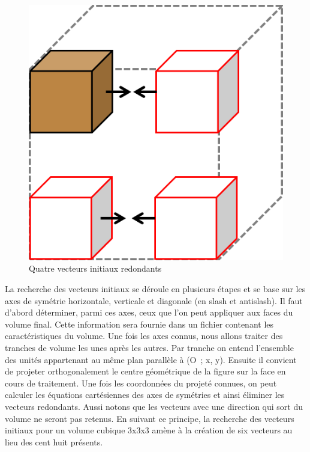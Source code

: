 \begin{figure}[h]
 \centering
 \includegraphics[scale=0.5,keepaspectratio=true]{img/startingPoint.png}
 \caption{Quatre vecteurs initiaux redondants}
 \label{startingPoint}
\end{figure}

La recherche des vecteurs initiaux se déroule en plusieurs étapes et se base sur les axes de symétrie horizontale, verticale et diagonale (en slash et antislash). Il faut d’abord déterminer, parmi ces axes, ceux que l’on peut appliquer aux faces du volume final. Cette information sera fournie dans un fichier contenant les caractéristiques du volume. Une fois les axes connus, nous allons traiter des tranches de volume les unes après les autres. Par tranche on entend l’ensemble des unités appartenant au même plan parallèle à (O ; x, y). Ensuite il convient de projeter orthogonalement le centre géométrique de la figure sur la face en cours de traitement. Une fois les coordonnées du projeté connues, on peut calculer les équations cartésiennes des axes de symétries et ainsi éliminer les vecteurs redondants. Aussi notons que les vecteurs avec une direction qui sort du volume ne seront pas retenus. En suivant ce principe, la recherche des vecteurs initiaux pour un volume cubique 3x3x3 amène à la création de six vecteurs au lieu des cent huit présents.